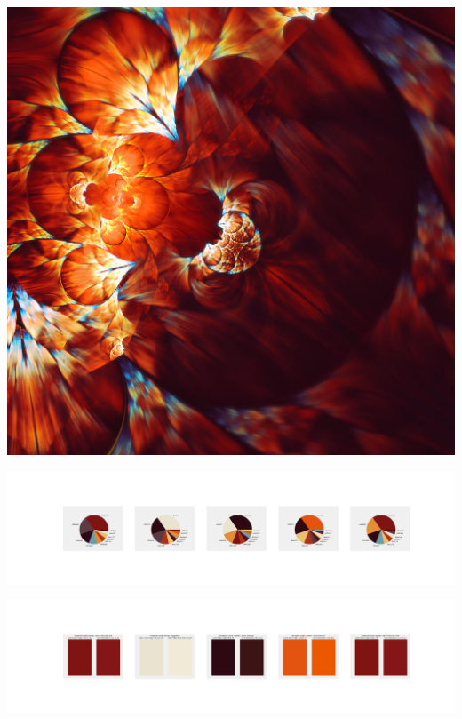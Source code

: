 \documentclass[11pt]{article}
\begin{document}
\begin{landscape}
    \begin{center}
    \includegraphics[width=\textwidth]{./nbimg/file (429).jpg}
    \end{center}

    \begin{center}
    \includegraphics[width=250mm]{./nbimg/pie-366.jpg}
    \end{center}

    \begin{center}
    \includegraphics[width=250mm]{./nbimg/peak-366.jpg}
    \end{center}
    


\end{landscape}
\end{document}
